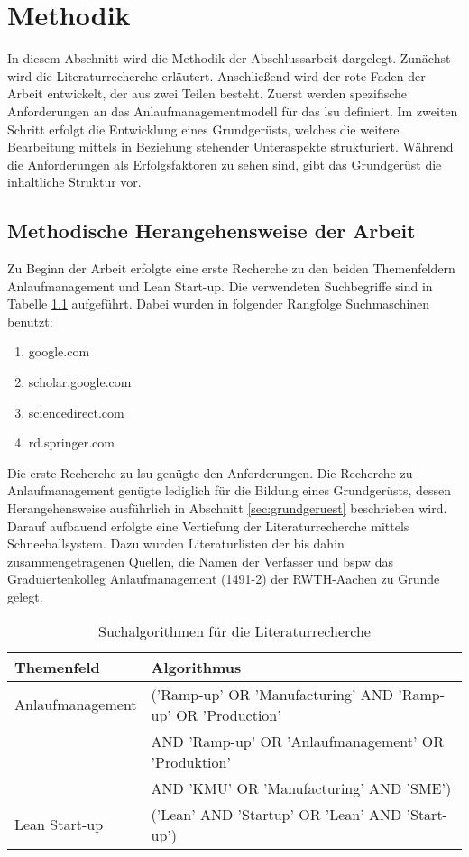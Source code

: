 \chapter{Methodik}\label{sec:methodik}
In diesem Abschnitt wird die Methodik der Abschlussarbeit dargelegt. Zunächst wird die Literaturrecherche erläutert. Anschließend wird der rote Faden der Arbeit entwickelt, der aus zwei Teilen besteht. Zuerst werden spezifische Anforderungen an das Anlaufmanagementmodell für das \gls{lsu} definiert. Im zweiten Schritt erfolgt die Entwicklung eines Grundgerüsts, welches die weitere Bearbeitung mittels in Beziehung stehender Unteraspekte strukturiert. Während die Anforderungen als Erfolgsfaktoren zu sehen sind, gibt das Grundgerüst die inhaltliche Struktur vor.  


\section{Methodische Herangehensweise der Arbeit}

Zu Beginn der Arbeit erfolgte eine erste Recherche zu den beiden Themenfeldern Anlaufmanagement und Lean Start-up. Die verwendeten Suchbegriffe sind in Tabelle \ref{tab:algorythm} aufgeführt. Dabei wurden in folgender Rangfolge Suchmaschinen benutzt: 
\begin{enumerate}
 \item google.com
 \item scholar.google.com
 \item sciencedirect.com
 \item rd.springer.com
 \end{enumerate}
 Die erste Recherche zu \gls{lsu} genügte den Anforderungen. Die Recherche zu Anlaufmanagement genügte lediglich für die Bildung eines Grundgerüsts, dessen Herangehensweise ausführlich in Abschnitt \ref{sec:grundgeruest} beschrieben wird. Darauf aufbauend erfolgte eine Vertiefung der Literaturrecherche mittels Schneeballsystem. Dazu wurden Literaturlisten der bis dahin zusammengetragenen Quellen, die Namen der Verfasser und \gls{bspw} das Graduiertenkolleg Anlaufmanagement (1491-2) der RWTH-Aachen zu Grunde gelegt. 
\begin{table}[h]
\caption{Suchalgorithmen für die Literaturrecherche} \label{tab:algorythm} 
\begin{center}
\begin{tabular}{l l}
\textbf{Themenfeld} & \textbf{Algorithmus }\\ \hline
Anlaufmanagement & ('Ramp-up' OR 'Manufacturing' AND 'Ramp-up' OR 'Production' \\ 
& AND 'Ramp-up' OR 'Anlaufmanagement' OR 'Produktion' \\
& AND 'KMU' OR 'Manufacturing' AND 'SME') \\
Lean Start-up & ('Lean' AND 'Startup' OR 'Lean' AND 'Start-up')
 \end{tabular} 
 \end{center}
\end{table}

